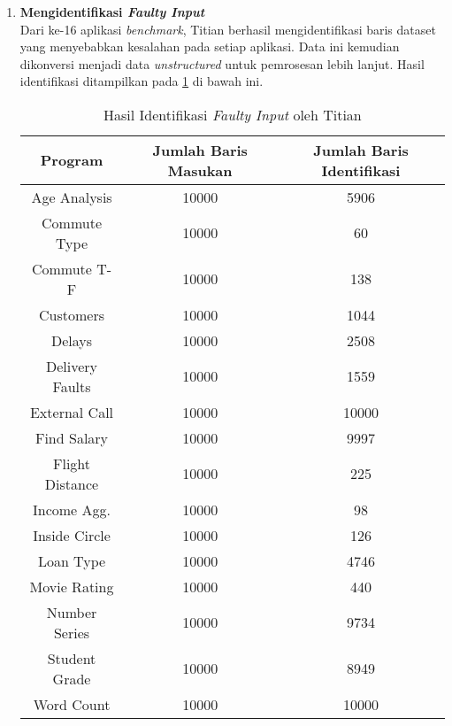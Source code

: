 \begin{enumerate}[topsep=0pt]
      \item \textbf{Mengidentifikasi \emph{Faulty Input}} \\
      Dari ke-16 aplikasi \emph{benchmark}, Titian berhasil mengidentifikasi baris dataset yang menyebabkan kesalahan pada setiap aplikasi. Data ini kemudian dikonversi menjadi data \emph{unstructured} untuk pemrosesan lebih lanjut.
      Hasil identifikasi ditampilkan pada \ref{tab:HasilIdentifikasi} di bawah ini.
  
      \begin{table}[H]
      \centering
      \caption{Hasil Identifikasi \emph{Faulty Input} oleh Titian}
      \label{tab:HasilIdentifikasi}
      \begin{tabular}{|c|c|c|}
      \hline
      \textbf{Program} & \textbf{Jumlah Baris Masukan} & \textbf{Jumlah Baris Identifikasi} \\
      \hline
      Age Analysis & 10000 & 5906 \\
      \hline
      Commute Type & 10000 & 60 \\
      \hline
      Commute T-F & 10000 & 138 \\
      \hline
      Customers & 10000 & 1044 \\
      \hline
      Delays & 10000 & 2508 \\
      \hline
      Delivery Faults & 10000 & 1559 \\
      \hline
      External Call & 10000 & 10000 \\
      \hline
      Find Salary & 10000 & 9997 \\
      \hline
      Flight Distance & 10000 & 225 \\
      \hline
      Income Agg. & 10000 & 98 \\
      \hline
      Inside Circle & 10000 & 126 \\
      \hline
      Loan Type & 10000 & 4746 \\
      \hline
      Movie Rating & 10000 & 440 \\
      \hline
      Number Series & 10000 & 9734 \\
      \hline
      Student Grade & 10000 & 8949 \\
      \hline
      Word Count & 10000 & 10000 \\
      \hline
      \end{tabular}
      \end{table}
  

\end{enumerate}
